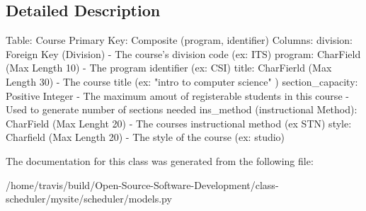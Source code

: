 \subsection{Detailed Description}
\begin{DoxyVerb}    Table: Course
    Primary Key: Composite (program, identifier)
    Columns:
        division: Foreign Key (Division)
            - The course's division code (ex: ITS)
        program: CharField (Max Length 10)
            -  The program identifier (ex: CSI)
        title: CharFierld (Max Length 30) 
            - The course title (ex: "intro to computer science" )
        section_capacity: Positive Integer
            - The maximum amout of registerable students in this course
            - Used to generate number of sections needed
        ins_method (instructional Method): CharField (Max Lenght 20)
            - The courses instructional method (ex STN)
        style: Charfield (Max Length 20)
            - The style of the course (ex: studio)\end{DoxyVerb}
 

The documentation for this class was generated from the following file\-:\begin{DoxyCompactItemize}
\item 
/home/travis/build/\-Open-\/\-Source-\/\-Software-\/\-Development/class-\/scheduler/mysite/scheduler/models.\-py\end{DoxyCompactItemize}

